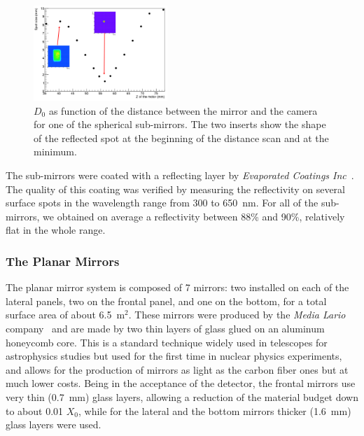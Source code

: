 \documentclass[5p,times,twocolumn]{elsarticle}
\begin{document}
\begin{figure}
\begin{center}
\includegraphics[width=0.45\textwidth]{SpotCMA.pdf}
\caption{$D_0$ as function of the distance between the mirror and the camera for one of the spherical sub-mirrors.
  The two inserts show the shape of the reflected spot at the beginning of the distance scan and at the minimum.}
\label{Fig:SpotCMA}
\end{center}
\end{figure}

The sub-mirrors were coated with a reflecting layer by {\it Evaporated Coatings Inc}~\cite{REF:ECI}. The quality of
this coating was verified by measuring the reflectivity on several surface spots in the wavelength range from 300 to
650~nm. For all of the sub-mirrors, we obtained on average a reflectivity between 88\% and 90\%, relatively flat in
the whole range.

\subsubsection{The Planar Mirrors}

The planar mirror system is composed of 7 mirrors: two installed on each of the lateral panels, two on the frontal panel,
and one on the bottom, for a total surface area of about 6.5~m$^2$. These mirrors were produced by the {\it Media
Lario} company~\cite{REF:MediaLario} and are made by two thin layers of glass glued on an aluminum honeycomb core.
This is a standard technique widely used in telescopes for astrophysics studies but used for the first time in nuclear
physics experiments, and allows for the production of mirrors as light as the carbon fiber ones but at much lower costs.
Being in the acceptance of the detector, the frontal mirrors use very thin (0.7~mm) glass layers, allowing a reduction of
the material budget down to about 0.01 $X_0$, while for the lateral and the bottom mirrors thicker (1.6~mm) glass
layers were used.
\end{document}
